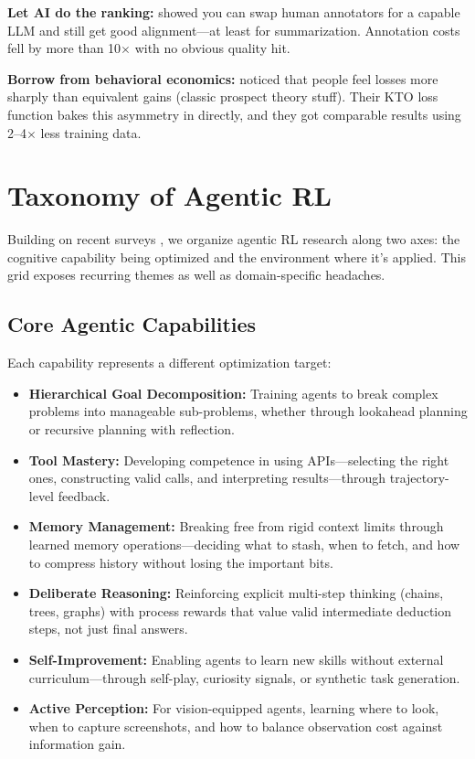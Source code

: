 \documentclass[12pt,a4paper]{report}
\theoremstyle{definition}
\begin{document}
\textbf{Let AI do the ranking:} \citet{lee2023rlaif} showed you can swap human annotators for a capable LLM and still get good alignment---at least for summarization. Annotation costs fell by more than 10$\times$ with no obvious quality hit.

\textbf{Borrow from behavioral economics:} \citet{ethayarajh2024kto} noticed that people feel losses more sharply than equivalent gains (classic prospect theory stuff). Their KTO loss function bakes this asymmetry in directly, and they got comparable results using 2--4$\times$ less training data.

\section{Taxonomy of Agentic RL}
\label{sec:taxonomy}

Building on recent surveys \cite{wang2025landscape}, we organize agentic RL research along two axes: the cognitive capability being optimized and the environment where it's applied. This grid exposes recurring themes as well as domain-specific headaches.

\subsection{Core Agentic Capabilities}
Each capability represents a different optimization target:
\begin{itemize}
    \item \textbf{Hierarchical Goal Decomposition:} Training agents to break complex problems into manageable sub-problems, whether through lookahead planning or recursive planning with reflection.
    \item \textbf{Tool Mastery:} Developing competence in using APIs---selecting the right ones, constructing valid calls, and interpreting results---through trajectory-level feedback.
    \item \textbf{Memory Management:} Breaking free from rigid context limits through learned memory operations---deciding what to stash, when to fetch, and how to compress history without losing the important bits.
    \item \textbf{Deliberate Reasoning:} Reinforcing explicit multi-step thinking (chains, trees, graphs) with process rewards that value valid intermediate deduction steps, not just final answers.
    \item \textbf{Self-Improvement:} Enabling agents to learn new skills without external curriculum---through self-play, curiosity signals, or synthetic task generation.
    \item \textbf{Active Perception:} For vision-equipped agents, learning where to look, when to capture screenshots, and how to balance observation cost against information gain.
\end{itemize}
\end{document}
